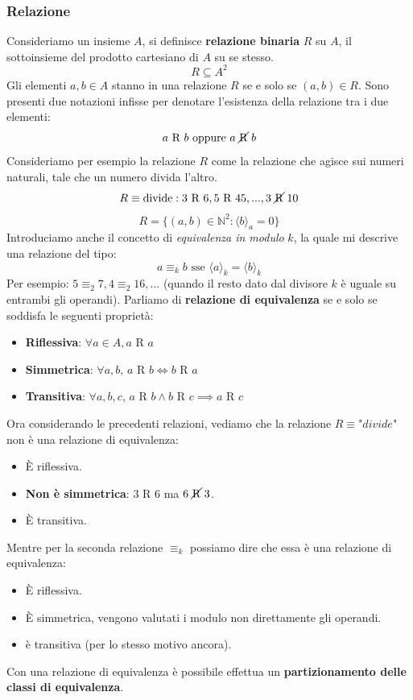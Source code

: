 \documentclass{article}
\begin{document}
\subsubsection{Relazione}
Consideriamo un insieme $A$, si definisce \textbf{relazione binaria} $R$ su $A$,
il sottoinsieme del prodotto cartesiano di $A$ su se stesso.
$$R\subseteq A^2$$
Gli elementi $a,b\in A$ stanno in una relazione $R$ se e solo se $(a,b)\in R$. Sono
presenti due notazioni infisse per denotare l'esistenza della relazione tra i due
elementi:
$$a\text{ R }b \text{ oppure } a\text{ \cancel{R} }b$$
Consideriamo per esempio la relazione $R$ come la relazione che agisce sui numeri naturali,
tale che un numero divida l'altro.
$$R\equiv \text{divide}: 3\text{ R }6, 5\text{ R }45, ...,3\text{ \cancel{R} }10$$
$$R=\{(a,b)\in\mathbb{N}^2:\langle b\rangle_a=0\}$$
Introduciamo anche il concetto di \textit{equivalenza in modulo} $k$, la quale mi
descrive una relazione del tipo:
$$a\equiv_k b \text{ sse } \langle a\rangle_k =\langle b\rangle_k$$
Per esempio: $5\equiv_2 7, 4\equiv_2 16,...$ (quando il resto dato dal divisore $k$ è
uguale su entrambi gli operandi).
\newline
Parliamo di \textbf{relazione di equivalenza} se e solo se soddisfa le seguenti
proprietà:
\begin{itemize}
    \item \textbf{Riflessiva}: $\forall a\in A, a\text{ R }a$
    \item \textbf{Simmetrica}: $\forall a,b\text{, } a\text{ R }b \Leftrightarrow b\text{ R }a$
    \item \textbf{Transitiva}: $\forall a,b,c\text{, }a\text{ R }b\land b\text{ R }c\implies a\text{ R }c$
\end{itemize}

Ora considerando le precedenti relazioni, vediamo che la relazione $R\equiv\textit{"divide"}$
non è una relazione di equivalenza:
\begin{itemize}
    \item È riflessiva.
    \item \textbf{Non è simmetrica}: $3\text{ R }6$ ma $6\text{ \cancel{R} }3$.
    \item È transitiva.
\end{itemize}
Mentre per la seconda relazione $\equiv_k$ possiamo dire che essa è una
relazione di equivalenza:
\begin{itemize}
    \item È riflessiva.
    \item È simmetrica, vengono valutati i modulo non direttamente gli operandi.
    \item è transitiva (per lo stesso motivo ancora).
\end{itemize}
Con una relazione di equivalenza è possibile effettua un \textbf{partizionamento
    delle classi di equivalenza}.
\end{document}
